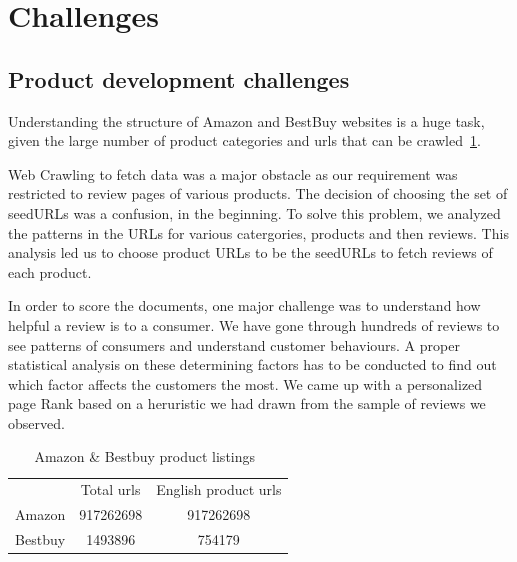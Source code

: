 \documentclass{article}
\begin{document}
\section{Challenges}
\subsection{Product development challenges}
\begin{description}
  \item Understanding the structure of Amazon and BestBuy websites is a huge task, given the large number of product categories and urls that can be crawled~\ref{tab:bestbuy}. 
  \item Web Crawling to fetch data was a major obstacle as our requirement was restricted to review pages of various products. The decision of choosing the set of seedURLs was a confusion, in the beginning. To solve this problem, we analyzed the patterns in the URLs for various catergories, products and then reviews. This analysis led us to choose product URLs to be the seedURLs to fetch reviews of each product.
  \item In order to score the documents, one major challenge was to understand how helpful a review is to a consumer. We have gone through hundreds of reviews to see patterns of consumers and understand customer behaviours. A proper statistical analysis on these determining factors has to be conducted to find out which factor affects the customers the most. We came up with a personalized page Rank based on a heruristic we had drawn from the sample of reviews we observed.
\end{description}

\begin{table}
  \centering
  \begin{tabular}{c c c} 
    & Total urls & English product urls \\
    Amazon & 917262698 & 917262698\\
    Bestbuy & 1493896 & 754179\\
  \end{tabular}
  \caption{Amazon \& Bestbuy product listings~\label{tab:bestbuy}}
\end{table}
\end{document}
